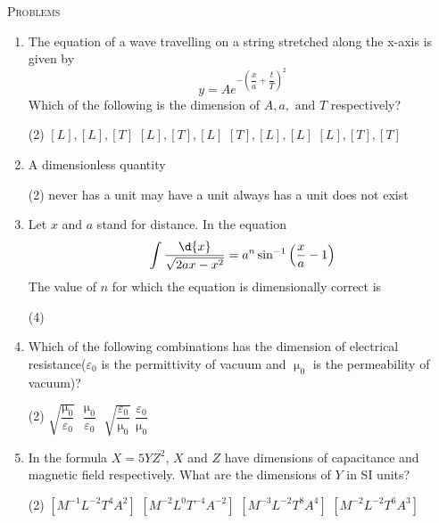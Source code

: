 \documentclass{article}
\renewcommand{\ans}{\quad}
\begin{document}
\begin{center}
    \textsc{Problems}
\end{center}
\begin{enumerate}
    \item The equation of a wave travelling on a string stretched along the x-axis is given by \[ y=Ae^{-\left(\dfrac{x}{a}+\dfrac{t}{T}\right)^2} \] Which of the following is the dimension of $A, a, \text{ and } T$ respectively?
        \begin{tasks}(2)
            \task $[L], [L], [T]$ \ans
            \task $[L], [T], [L]$
            \task $[T], [L], [L]$
            \task $[L], [T], [T]$
        \end{tasks}

    \item A dimensionless quantity
        \begin{tasks}(2)
            \task never has a unit
            \task may have a unit \ans
            \task always has a unit
            \task does not exist
        \end{tasks}

    \item Let $x$ and $a$ stand for distance. In the equation \[ \int \dfrac{\d{x}}{\sqrt{2ax-x^2}} = a^n \sin^{-1}\left(\dfrac{x}{a}-1\right) \] The value of $n$ for which the equation is dimensionally correct is
        \begin{tasks}(4)
            \ans
        \end{tasks}

    \item Which of the following combinations has the dimension of electrical resistance($\varepsilon_0$ is the permittivity of vacuum and $\upmu_0$ is the permeability of vacuum)?
    \begin{tasks}(2)
        \task $\sqrt{\dfrac{\upmu_0}{\varepsilon_0}}$\ans
        \task $\dfrac{\upmu_0}{\varepsilon_0}$
        \task $\sqrt{\dfrac{\varepsilon_0}{\upmu_0}}$
        \task $\dfrac{\varepsilon_0}{\upmu_0}$
    \end{tasks}

    \item In the formula $X=5YZ^2$, $X$ and $Z$ have dimensions of capacitance and magnetic field respectively. What are the dimensions of $Y$ in SI units?
        \begin{tasks}(2)
            \task $[M^{-1}L^{-2}T^4A^2]$
            \task $[M^{-2}L^{0}T^{-4}A^{-2}]$
            \task $[M^{-3}L^{-2}T^8A^4]$\ans
            \task $[M^{-2}L^{-2}T^6A^3]$
        \end{tasks}


\end{enumerate}
\end{document}
